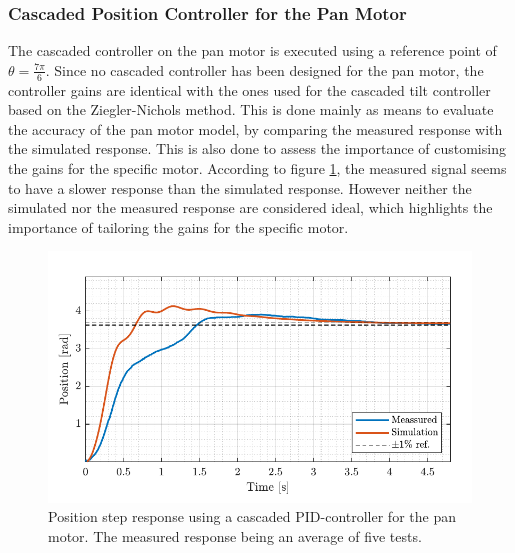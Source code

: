 \documentclass[../../main.tex]{subfiles}
\begin{document}
\subsubsection*{Cascaded Position Controller for the Pan Motor}
The cascaded controller on the pan motor is executed using a reference point of $\theta = \frac{7\pi}{6}$. Since no cascaded controller has been designed for the pan motor, the controller gains are identical with the ones used for the cascaded tilt controller based on the Ziegler-Nichols method. This is done mainly as means to evaluate the accuracy of the pan motor model, by comparing the measured response with the simulated response. This is also done to assess the importance of customising the gains for the specific motor.
According to figure \ref{fig:cascade_ZN_pan}, the measured signal seems to have a slower response than the simulated response. However neither the simulated nor the measured response are considered ideal, which highlights the importance of tailoring the gains for the specific motor.

\begin{figure}[h]
    \centering
    \includegraphics[width = 0.7 \textwidth]{Sections/Test/Images/CascadePanTest.pdf}
    \caption{Position step response using a cascaded PID-controller for the pan motor. The measured response being an average of five tests.}
    \label{fig:cascade_ZN_pan}
\end{figure}
\end{document}
